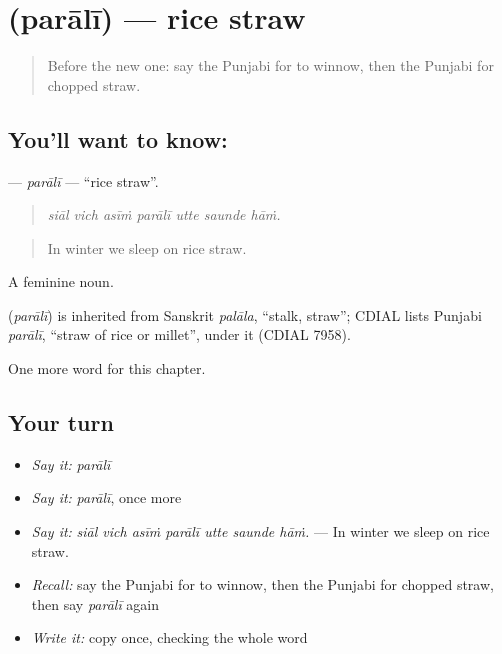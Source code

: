 \section[\texorpdfstring{\pa{ਪਰਾਲੀ} (parālī)}{ਪਰਾਲੀ (parālī)}]{ (parālī) — rice straw}

\label{lesson:PA-C306-parali}



\begin{quote}
Before the new one: say the Punjabi for to winnow, then the Punjabi for chopped straw.
\end{quote}

\subsection*{You'll want to know: }
\textbf{} — \emph{parālī} — \textquotedblleft{}rice straw\textquotedblright{}.

\begin{quote}
      
\end{quote}

\begin{quote}
\emph{siāl vich asīṁ parālī utte saunde hāṁ.}
\end{quote}

\begin{quote}
In winter we sleep on rice straw.
\end{quote}

A feminine noun.

\begin{cousinweb}
\textbf{} (\emph{parālī}) is inherited from Sanskrit \emph{palāla}, \textquotedblleft{}stalk, straw\textquotedblright{}; CDIAL lists Punjabi \emph{parālī}, \textquotedblleft{}straw of rice or millet\textquotedblright{}, under it (CDIAL 7958).
\end{cousinweb}

\begin{grammarlens}[title={What you've built}]
One more word for this chapter.
\end{grammarlens}

\subsection*{Your turn}
\begin{itemize}
\raggedright
  \item \emph{Say it:} \emph{parālī}
  \item \emph{Say it:} \emph{parālī}, once more
  \item \emph{Say it:} \emph{siāl vich asīṁ parālī utte saunde hāṁ.} — In winter we sleep on rice straw.
  \item \emph{Recall:} say the Punjabi for to winnow, then the Punjabi for chopped straw, then say \emph{parālī} again
  \item \emph{Write it:} copy \textbf{} once, checking the whole word
\end{itemize}

